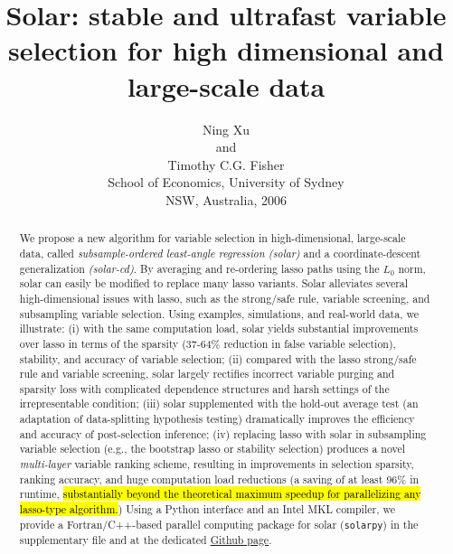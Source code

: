 \documentclass[12pt]{article}
\begin{document}

\title{\bf Solar: stable and ultrafast variable selection for high dimensional and large-scale data}
\author{Ning Xu \hspace{.4cm}\\
  and \hspace{.4cm}\\
  Timothy C.G. Fisher \hspace{.4cm}\\
  School of Economics, University of Sydney \hspace{.4cm}\\
  NSW, Australia, 2006}
\clearpage\maketitle

\begin{abstract}
  We propose a new algorithm for variable selection in high-dimensional, large-scale data, called \emph{subsample-ordered least-angle regression (solar)} and a coordinate-descent generalization \emph{(solar-cd)}. By averaging and re-ordering lasso paths using the $L_0$ norm, solar can easily be modified to replace many lasso variants. Solar alleviates several high-dimensional issues with lasso, such as the strong/safe rule, variable screening, and subsampling variable selection. Using examples, simulations, and real-world data, we illustrate: (i) with the same computation load, solar yields substantial improvements over lasso in terms of the sparsity (37-64\% reduction in false variable selection), stability, and accuracy of variable selection; (ii) compared with the lasso strong/safe rule and variable screening, solar largely rectifies incorrect variable purging and sparsity loss with complicated dependence structures and harsh settings of the irrepresentable condition; (iii) solar supplemented with the hold-out average test (an adaptation of data-splitting hypothesis testing) dramatically improves the efficiency and accuracy of post-selection inference; (iv) replacing lasso with solar in subsampling variable selection (e.g., the bootstrap lasso or stability selection) produces a novel \emph{multi-layer} variable ranking scheme, resulting in improvements in selection sparsity, ranking accuracy, and huge computation load reductions (a saving of at least 96\% in runtime, \hl{substantially beyond the theoretical maximum speedup for parallelizing any lasso-type algorithm.}) Using a Python interface and an Intel MKL compiler, we provide a Fortran/C++-based parallel computing package for solar (\texttt{solarpy}) in the supplementary file and at the dedicated \href{https://github.com/isaac2math/solarpy}{Github page}.
\end{abstract}
\end{document}
